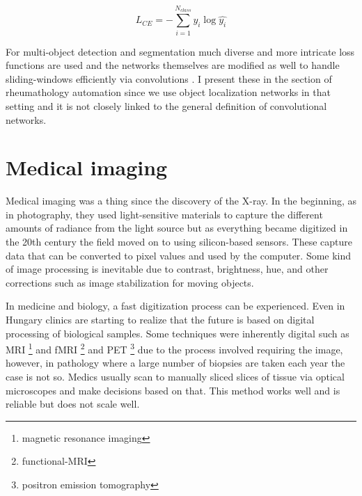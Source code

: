 \documentclass[a4paper,12pt]{article}
\begin{document}
\vspace{4mm}

\begin{equation}
    L_{CE} = - \sum_{i = 1}^{N_{class}} y_{i}\log\hat{y_{i}}
\end{equation}

\vspace{4mm}

\par For multi-object detection and segmentation much diverse and more intricate loss functions are used and the networks themselves \cite{ren2015faster} are modified as well to handle sliding-windows efficiently via convolutions \cite{redmon2016you}. I present these in the section of rheumathology automation since we use object localization networks in that setting and it is not closely linked to the general definition of convolutional networks.

\newpage

\section{Medical imaging}

\vspace{7mm}

\par Medical imaging was a thing since the discovery of the X-ray. In the beginning, as in photography, they used light-sensitive materials to capture the different amounts of radiance from the light source but as everything became digitized in the 20th century the field moved on to using silicon-based sensors. These capture data that can be converted to pixel values and used by the computer. Some kind of image processing is inevitable due to contrast, brightness, hue, and other corrections such as image stabilization for moving objects.

\vspace{4mm}

\par In medicine and biology, a fast digitization process can be experienced. Even in Hungary clinics are starting to realize that the future is based on digital processing of biological samples. Some techniques were inherently digital such as MRI \footnote{magnetic resonance imaging} and fMRI \footnote{functional-MRI} and PET \footnote{positron emission tomography} due to the process involved requiring the image, however, in pathology where a large number of biopsies are taken each year the case is not so. Medics usually scan to manually sliced slices of tissue via optical microscopes and make decisions based on that. This method works well and is reliable but does not scale well. 
\end{document}
